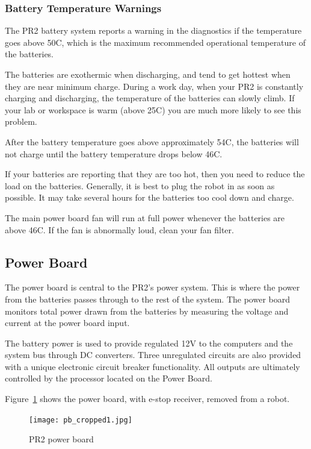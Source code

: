 \subsubsection{Battery Temperature Warnings}

The PR2 battery system reports a warning in the diagnostics if the temperature goes above 50C, which is the maximum recommended operational temperature of the batteries. 

The batteries are exothermic when discharging, and tend to get hottest when they are near minimum charge. During a work day, when your PR2 is constantly charging and discharging, the temperature of the batteries can slowly climb. If your lab or workspace is warm (above 25C) you are much more likely to see this problem.

After the battery temperature goes above approximately 54C, the batteries will not charge until the battery temperature drops below 46C. 

If your batteries are reporting that they are too hot, then you need to reduce the load on the batteries. Generally, it is best to plug the robot in as soon as possible. It may take several hours for the batteries too cool down and charge.

The main power board fan will run at full power whenever the batteries are above 46C. If the fan is abnormally loud, clean your fan filter.

\subsection{Power Board}
The power board is central to the PR2's power system. This is where
the power from the batteries passes through to the rest of the
system. The power board monitors total power drawn from the batteries
by measuring the voltage and current at the power board input.

The battery power is used to provide regulated 12V to the computers and
the system bus through DC converters. Three unregulated circuits are also
provided with a unique electronic circuit breaker functionality. All outputs are
ultimately controlled by the processor located on the Power Board.

Figure~\ref{fig:power_board} shows the power board, with e-stop receiver, removed from a robot.

\begin{figure}[tb]
\centering
\texttt{[image: pb\_cropped1.jpg]}
\caption{PR2 power board}
\label{fig:power_board}
\end{figure}


